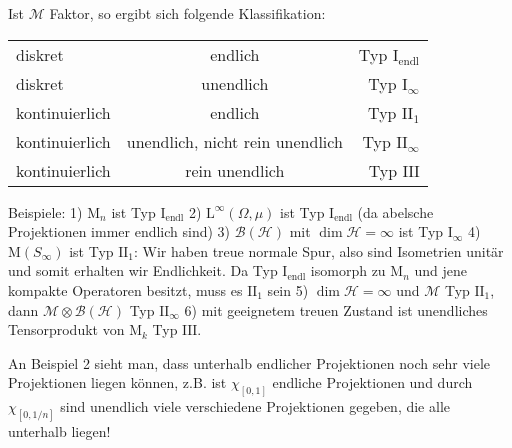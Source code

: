 \documentclass[11pt,a4paper]{scrartcl}
\newcommand{\Hc}{\mathcal{H}}
\newcommand{\B}{\mathcal{B}}
\newcommand{\M}{\mathcal{M}}
\newcommand{\Ifin}{\mathrm{I}_\mathrm{endl}}
\newcommand{\Iinf}{\mathrm{I}_\infty}
\newcommand{\IIfin}{\mathrm{II}_1}
\newcommand{\IIinf}{\mathrm{II}_\infty}
\newcommand{\III}{\mathrm{III}}
\theoremstyle{plain}
\theoremstyle{definition}
\theoremstyle{remark}
\begin{document}
Ist $\M$ Faktor, so ergibt sich folgende Klassifikation:

\begin{table}[h]
    \centering
    \begin{tabular}{l|c||r}
        diskret & endlich & Typ $\Ifin$ \\
        diskret & unendlich & Typ $\Iinf$ \\
        \hline
        kontinuierlich & endlich & Typ $\IIfin$ \\
        kontinuierlich & unendlich, nicht rein unendlich & Typ $\IIinf$ \\
        \hline
        kontinuierlich & rein unendlich & Typ $\III$
    \end{tabular}
\end{table}

Beispiele: 1) $\mathrm{M}_n$ ist Typ $\Ifin$ 2) $\mathrm{L}^\infty(\Omega, \mu)$ ist Typ $\Ifin$ (da abelsche Projektionen immer endlich sind) 3) $\B(\Hc)$ mit $\dim \Hc = \infty$ ist Typ $\Iinf$ 4) $\mathrm{M}(S_\infty)$ ist Typ $\IIfin$: Wir haben treue normale Spur, also sind Isometrien unitär und somit erhalten wir Endlichkeit. Da Typ $\Ifin$ isomorph zu $\mathrm{M}_n$ und jene kompakte Operatoren besitzt, muss es $\IIfin$ sein 5) $\dim \Hc = \infty$ und $\M$ Typ $\IIfin$, dann $\M \otimes \B(\Hc)$ Typ $\IIinf$ 6) mit geeignetem treuen Zustand ist unendliches Tensorprodukt von $\mathrm{M}_k$ Typ $\III$.

An Beispiel 2 sieht man, dass unterhalb endlicher Projektionen noch sehr viele Projektionen liegen können, z.B. ist $\chi_{[0,1]}$ endliche Projektionen und durch $\chi_{[0,1/n]}$ sind unendlich viele verschiedene Projektionen gegeben, die alle unterhalb liegen!
\end{document}
